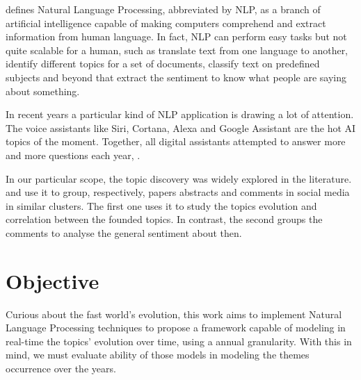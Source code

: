  defines Natural Language Processing, abbreviated by NLP, as a branch of artificial intelligence capable of making computers comprehend and extract information from human language.
In fact, NLP can perform easy tasks but not quite scalable for a human, such as translate text from one language to another, identify different topics for a set of documents, classify text on predefined subjects and beyond that extract the sentiment to know what people are saying about something.

In recent years a particular kind of NLP application is drawing a lot of attention. The voice assistants like Siri, Cortana, Alexa and Google Assistant are the hot AI topics of the moment. Together, all digital assistants attempted to answer more and more questions each year, \cite{kailakrayewski2019}.

\newpage
In our particular scope, the topic discovery was widely explored in the literature.  and  use it to group, respectively, papers abstracts and comments in social media in similar clusters. The first one uses it to study the topics evolution and correlation between the founded topics. In contrast, the second groups the comments to analyse the general sentiment about then.


\section{Objective}


Curious about the fast world's evolution, this work aims to implement Natural Language Processing techniques to propose a framework capable of modeling in real-time the topics' evolution over time, using a annual granularity. With this in mind, we must evaluate ability of those models in modeling the themes occurrence over the years.

